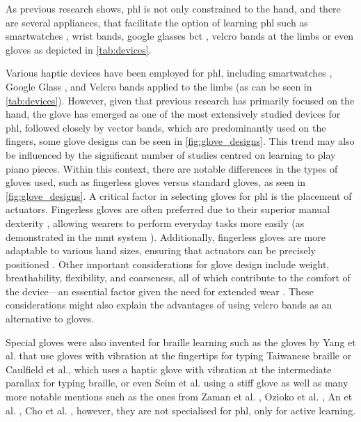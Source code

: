 As previous research shows, \gls{phl} is not only constrained to the hand, and there are several appliances, that facilitate the option of learning \gls{phl} such as smartwatches \cite{Seim2018}, wrist bands, google glasses \gls{bct} \cite{Seim2016a}, velcro bands at the limbs \cite{Bouwer2011} or even gloves as depicted in \autoref{tab:devices}.

Various haptic devices have been employed for \gls{phl}, including smartwatches \cite{Seim2018}, Google Glass \cite{Seim2016a}, and Velcro bands applied to the limbs \cite{Bouwer2011} (as can be seen in \autoref{tab:devices}). However, given that previous research has primarily focused on the hand, the glove has emerged as one of the most extensively studied devices for \gls{phl}, followed closely by vector bands, which are predominantly used on the fingers, some glove designs can be seen in \autoref{fig:glove_designs}. This trend may also be influenced by the significant number of studies centred on learning to play piano pieces.
Within this context, there are notable differences in the types of gloves used, such as fingerless gloves versus standard gloves, as seen in \autoref{fig:glove_designs}. A critical factor in selecting gloves for \gls{phl} is the placement of actuators. Fingerless gloves are often preferred due to their superior manual dexterity \cite{Huang2008}, allowing wearers to perform everyday tasks more easily (as demonstrated in the \gls{mmt} system \cite{Markow2010, Kohlsdorf2010, Huang2010}). Additionally, fingerless gloves are more adaptable to various hand sizes, ensuring that actuators can be precisely positioned \cite{Seim2014a, Seim2015b}.
Other important considerations for glove design include weight, breathability, flexibility, and coarseness, all of which contribute to the comfort of the device—an essential factor given the need for extended wear \cite{Markow2010, Kohlsdorf2010, Huang2010, Fang2023a}. These considerations might also explain the advantages of using velcro bands as an alternative to gloves.

Special gloves were also invented for braille learning such as the gloves by Yang et al. \cite{Yang2017} that use gloves with vibration at the fingertips for typing Taiwanese braille or \cite{Learning2024} Caulfield et al., which uses a haptic glove with vibration at the intermediate parallax for typing braille, or even Seim et al. \cite{Seim2014a} using a stiff glove \cite{Seim2014} as well as many more notable mentions such as the ones from Zaman et al. \cite{Zaman2019}, Ozioko et al. \cite{Ozioko2017}, An et al. \cite{An2004}, Cho et al. \cite{Cho2002}, however, they are not specialised for \gls{phl}, only for active learning.

